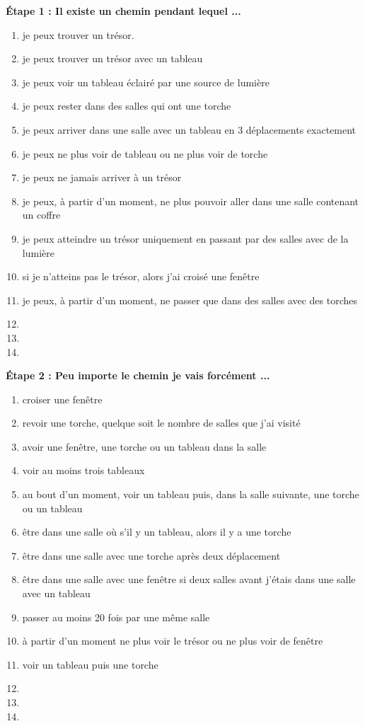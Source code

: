 \documentclass{article}
\begin{document}
\Large
\textbf{Étape 1 : Il existe un chemin pendant lequel ...}
\begin{enumerate}
    \item je peux trouver un trésor.
    \item je peux trouver un trésor avec un tableau
    \item je peux voir un tableau éclairé par une source de lumière
    \item je peux rester dans des salles qui ont une torche
    \item je peux arriver dans une salle avec un tableau en 3 déplacements exactement
    \item je peux ne plus voir de tableau ou ne plus voir de torche
    \item je peux ne jamais arriver à un trésor
    \item je peux, à partir d'un moment, ne plus pouvoir aller dans une salle contenant un coffre
    \item je peux atteindre un trésor uniquement en passant par des salles avec de la lumière
    \item si je n'atteins pas le trésor, alors j'ai croisé une fenêtre
    \item je peux, à partir d'un moment, ne passer que dans des salles avec des torches
    \item
    \item
    \item
\end{enumerate}
\newpage
\textbf{Étape 2 : Peu importe le chemin je vais forcément ... }
\begin{enumerate}
    \item croiser une fenêtre
    \item revoir une torche, quelque soit le nombre de salles que j'ai visité
    \item avoir une fenêtre, une torche ou un tableau dans la salle
    \item voir au moins trois tableaux
    \item au bout d'un moment, voir un tableau puis, dans la salle suivante, une torche
    ou un tableau
    \item être dans une salle où s'il y un tableau, alors il y a une torche
    \item être dans une salle avec une torche après deux déplacement
    \item être dans une salle avec une fenêtre si deux salles avant j'étais dans une salle avec un tableau
    \item passer au moins 20 fois par une même salle
    \item à partir d'un moment ne plus voir le trésor ou ne plus voir de fenêtre
    \item voir un tableau puis une torche
    \item
    \item
    \item
    
\end{enumerate}
\end{document}
